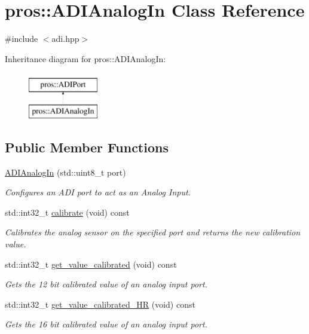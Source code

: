 \hypertarget{classpros_1_1ADIAnalogIn}{}\section{pros\+:\+:A\+D\+I\+Analog\+In Class Reference}
\label{classpros_1_1ADIAnalogIn}


{\ttfamily \#include $<$adi.\+hpp$>$}

Inheritance diagram for pros\+:\+:A\+D\+I\+Analog\+In\+:\begin{figure}[H]
\begin{center}
\leavevmode
\includegraphics[height=2.000000cm]{classpros_1_1ADIAnalogIn}
\end{center}
\end{figure}
\subsection*{Public Member Functions}
\begin{DoxyCompactItemize}
\item 
\hyperlink{classpros_1_1ADIAnalogIn_aeac81958e7ba33ee9693ab843f5b55ed}{A\+D\+I\+Analog\+In} (std\+::uint8\+\_\+t port)
\begin{DoxyCompactList}\small\item\em Configures an A\+DI port to act as an Analog Input. \end{DoxyCompactList}\item 
std\+::int32\+\_\+t \hyperlink{classpros_1_1ADIAnalogIn_ac8dd1e625cbcec4951d20be0c0fa2d3c}{calibrate} (void) const
\begin{DoxyCompactList}\small\item\em Calibrates the analog sensor on the specified port and returns the new calibration value. \end{DoxyCompactList}\item 
std\+::int32\+\_\+t \hyperlink{classpros_1_1ADIAnalogIn_a5930ce87c880833bda8cd202613b8d80}{get\+\_\+value\+\_\+calibrated} (void) const
\begin{DoxyCompactList}\small\item\em Gets the 12 bit calibrated value of an analog input port. \end{DoxyCompactList}\item 
std\+::int32\+\_\+t \hyperlink{classpros_1_1ADIAnalogIn_a65bfed175ed1b0efce4566e78e7f9473}{get\+\_\+value\+\_\+calibrated\+\_\+\+HR} (void) const
\begin{DoxyCompactList}\small\item\em Gets the 16 bit calibrated value of an analog input port. \end{DoxyCompactList}\end{DoxyCompactItemize}



